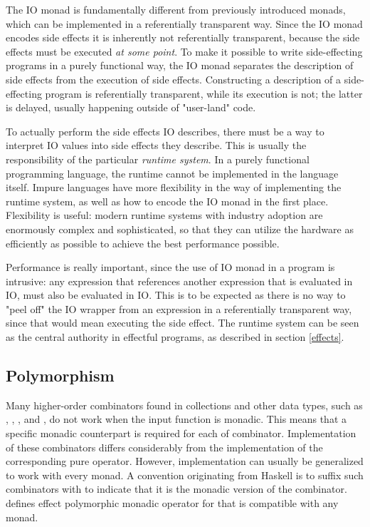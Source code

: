 

The IO monad is fundamentally different from previously introduced monads, which can be implemented in a referentially transparent way. Since the IO monad encodes side effects it is inherently not referentially transparent, because the side effects must be executed \textit{at some point}. To make it possible to write side-effecting programs in a purely functional way, the IO monad separates the description of side effects from the execution of side effects. Constructing a description of a side-effecting program is referentially transparent, while its execution is not; the latter is delayed, usually happening outside of "user-land" code.

To actually perform the side effects IO describes, there must be a way to interpret IO values into side effects they describe. This is usually the responsibility of the particular \textit{runtime system}. In a purely functional programming language, the runtime cannot be implemented in the language itself. Impure languages have more flexibility in the way of implementing the runtime system, as well as how to encode the IO monad in the first place. Flexibility is useful: modern runtime systems with industry adoption are enormously complex and sophisticated, so that they can utilize the hardware as efficiently as possible to achieve the best performance possible.

Performance is really important, since the use of IO monad in a program is intrusive: any expression that references another expression that is evaluated in IO, must also be evaluated in IO. This is to be expected as there is no way to "peel off" the IO wrapper from an expression in a referentially transparent way, since that would mean executing the side effect. The runtime system can be seen as the central authority in effectful programs, as described in section \ref{effects}.


\subsection{Polymorphism}
Many higher-order combinators found in collections and other data types, such as , , , and , do not work when the input function is monadic. This means that a specific monadic counterpart is required for each of combinator. Implementation of these combinators differs considerably from the implementation of the corresponding pure operator. However, implementation can usually be generalized to work with every monad. A convention originating from Haskell is to suffix such combinators with  to indicate that it is the monadic version of the combinator.  defines effect polymorphic monadic  operator for  that is compatible with any monad.

